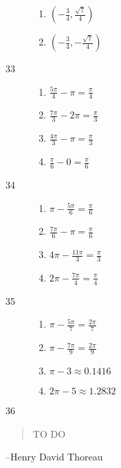 \documentclass{exam}
\begin{document}
\begin{description}
\begin{enumerate}[a]
          \item $\boxed{ \left( - \frac{3}{4}, \frac{\sqrt{7}}{4} \right) }$

          \item $\boxed{ \left( - \frac{3}{4}, - \frac{\sqrt{7}}{4} \right) }$

        \end{enumerate}

      \item[33] 
        \begin{enumerate}[a]
          \item $\frac{5 \pi}{4} - \pi   = \boxed{ \frac{\pi}{4} }$
          \item $\frac{7 \pi}{3} - 2 \pi = \boxed{ \frac{\pi}{3} }$
          \item $\frac{4 \pi}{3} - \pi   = \boxed{ \frac{\pi}{3} }$
          \item $\frac{\pi}{6} - 0       = \boxed{ \frac{\pi}{6} }$
        \end{enumerate}
        
      \item[34] 
        \begin{enumerate}[a]
          \item $ \pi - \frac{5 \pi}{6}   = \boxed{ \frac{\pi}{6} }$
          \item $\frac{7 \pi}{6} - \pi    = \boxed{ \frac{\pi}{6} }$
          \item $4 \pi - \frac{11 \pi}{3} = \boxed{ \frac{\pi}{3} }$
          \item $2 \pi - \frac{7 \pi}{4}  = \boxed{ \frac{\pi}{4} }$
        \end{enumerate}
        
      \item[35] 
        \begin{enumerate}[a]
          \item $\pi - \frac{5 \pi}{7} = \boxed{ \frac{2 \pi}{7} }$
          \item $\pi - \frac{7 \pi}{9} = \boxed{ \frac{2 \pi}{9} }$
          \item $\pi - 3         \approx \boxed{ 0.1416 }$
          \item $2 \pi - 5       \approx \boxed{ 1.2832 }$
        \end{enumerate}

      \item[36] 

    \end{description}
  \else
    \vspace{1 cm}
    \begin{quote}
      \begin{em}
        TO DO
      \end{em}
    \end{quote}
    \hspace{1 cm} --Henry David Thoreau
  \fi
\end{document}
